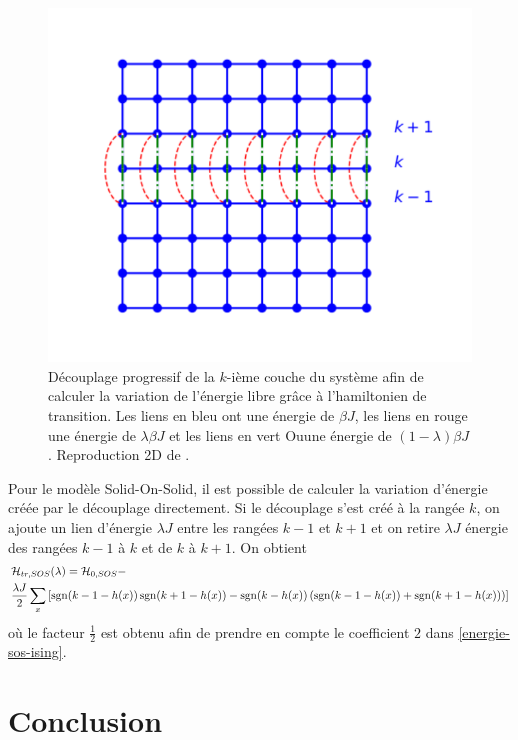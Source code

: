 \begin{figure}
\begin{minipage}[t]{0.3\linewidth}
		\includegraphics[width=\linewidth]{numerical/cross-hlambda.pdf}
		\caption*{$\mH_1$}
	\end{minipage}
	\caption{Découplage progressif de la $k$-ième couche du système afin de calculer la variation de l'énergie libre grâce à l'hamiltonien de transition. Les liens en bleu ont une énergie de $\beta J$, les liens en rouge une énergie de $\lambda \beta J $ et les liens en vert Ouune énergie de $ (1-\lambda) \beta J$. Reproduction 2D de \cite{vasilyev_monte_2007}.}
	\label{decouplage}
\end{figure}

Pour le modèle Solid-On-Solid, il est possible de calculer la variation d'énergie créée par le découplage directement. Si le découplage s'est créé à la rangée $k$, on ajoute un lien d'énergie $\lambda J$ entre les rangées $k-1$ et $k+1$ et on retire $\lambda J$ énergie des rangées $k-1$ à $k$  et de $k$ à $k+1$. On obtient
\begin{align}
    &\mathcal{H}_{tr,SOS}(\lambda) = \mathcal{H}_{0,SOS} - \nonumber \\
     &\frac{\lambda J}{2} \sum_x \left[ \operatorname{sgn}(k-1-h(x)) \operatorname{sgn}(k+1-h(x)) - \operatorname{sgn}(k-h(x)) \left( \operatorname{sgn}(k-1-h(x))+\operatorname{sgn}(k+1-h(x)) \right) \right]
\end{align}
où le facteur $\frac{1}{2}$ est obtenu afin de prendre en compte le coefficient $2$ dans \ref{energie-sos-ising}.

\section{Conclusion}

